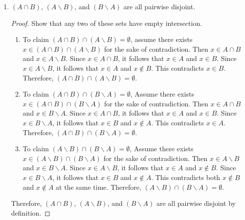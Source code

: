\documentclass{article}
\theoremstyle{definition}
\begin{document}
\begin{enumerate}
\begin{enumerate}
  \item $(A \cap B)$, $(A \backslash B)$, and $(B \backslash A)$ are all pairwise disjoint.
  \begin{proof}
    Show that any two of these sets have empty intersection.
    \begin{enumerate}
    \item To claim $(A \cap B) \cap (A \backslash B) = \emptyset$, 
    assume there exists $x \in (A \cap B) \cap (A \backslash B)$ for 
    the sake of contradiction. Then $x \in A \cap B$ and $x \in A \backslash B$. 
    Since $x \in A \cap B$, it follows that $x \in A$ and $x \in B$. 
    Since $x \in A \backslash B$, it follows that $x \in A$ and $x \notin B$. 
    This contradicts $x \in B$. Therefore, $(A \cap B) \cap (A \backslash B) = \emptyset$.
    \item To claim $(A \cap B) \cap (B \backslash A) = \emptyset$,
    Assume there exists $x \in (A \cap B) \cap (B \backslash A)$ for 
    the sake of contradiction. Then $x \in A \cap B$ and $x \in B \backslash A$. 
    Since $x \in A \cap B$, it follows that $x \in A$ and $x \in B$. 
    Since $x \in B \backslash A$, it follows that $x \in B$ and $x \notin A$. 
    This contradicts $x \in A$. Therefore, $(A \cap B) \cap (B \backslash A) = \emptyset$.
    \item To claim $(A \backslash B) \cap (B \backslash A) = \emptyset$,
    Assume there exists $x \in (A \backslash B) \cap (B \backslash A)$ for 
    the sake of contradiction. Then $x \in A \backslash B$ and $x \in B \backslash A$. 
    Since $x \in A \backslash B$, it follows that $x \in A$ and $x \notin B$. 
    Since $x \in B \backslash A$, it follows that $x \in B$ and $x \notin A$. 
    This contradicts both $x \notin B$ and $x \notin A$ at the same time. 
    Therefore, $(A \backslash B) \cap (B \backslash A) = \emptyset$.
    \end{enumerate}
    Therefore, $(A \cap B)$, $(A \backslash B)$, and $(B \backslash A)$ are all pairwise disjoint by definition.
  \end{proof}
  \end{enumerate}
  





\end{enumerate}
\end{document}
